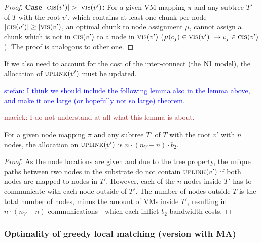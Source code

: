 \documentclass[9pt,twocolumn]{scrartcl}
\newcommand{\maciek}[1]{\textcolor{brown}{maciek: #1}}
\newcommand{\stefan}[1]{\textcolor{blue}{stefan: #1}}
\newcommand{\VmChunkAssignment}{\mu}
\newcommand{\NodeMapping}{\pi}
\newcommand{\SubstrateNode}{\ensuremath{v}}
\newcommand{\Uplink}{\ensuremath{\textsc{uplink}}}
\newcommand{\ChunkCount}{\ensuremath{\textsc{cis}}}
\newcommand{\VmCount}{\ensuremath{\textsc{vis}}}
\newcommand{\achunk}{\ensuremath{c}}
\newcommand{\CC}{\textsc{NI}}
\newcommand{\Tree}{\ensuremath{T}}
\newcommand{\CostCom}{\ensuremath{b_2}}
\newcommand{\Vms}{\ensuremath{n_V}}
\begin{document}
\begin{appendix}
\begin{proof}
\textbf{Case $|\ChunkCount(\SubstrateNode')| > |\VmCount(\SubstrateNode')$:}
For a given VM mapping $\NodeMapping$ and any subtree $\Tree'$ of $\Tree$
with the root $\SubstrateNode'$, which contains at least one chunk per
node $|\ChunkCount(\SubstrateNode')| \geq |\VmCount(\SubstrateNode')$, an
optimal chunk to node assignment $\VmChunkAssignment$, cannot assign a chunk
which is not in $\ChunkCount(\SubstrateNode')$ to a node in
$\VmCount(\SubstrateNode')$ ($\VmChunkAssignment(\achunk_j) \in
\VmCount(\SubstrateNode')~ \rightarrow \achunk_j \in
\ChunkCount(\SubstrateNode')$).
The proof is analogous to other one.
\end{proof}

If we also need to account for the cost of the inter-connect (the $\CC$ model),
the allocation of $\Uplink(\SubstrateNode')$ must be updated.

\stefan{I think we should include the following lemma also in the lemma above,
and make it one large (or hopefully not so large) theorem.}

\maciek{I do not understand at all what this lemma is about.}

\begin{lemma}
\label{lemma:comCost}
 For a given node mapping $\NodeMapping$ and any subtree $\Tree'$
 of $\Tree$ with the root $\SubstrateNode'$ with $n$ nodes,
 the allocation on
$\Uplink(\SubstrateNode')$ is $n \cdot (\Vms - n)
\cdot
\CostCom$.
\end{lemma}
\begin{proof}
As the node locations are given
and due to the tree property, the unique paths between
two nodes in the substrate do not contain
$\Uplink(\SubstrateNode')$ if both nodes are mapped to nodes in $\Tree'$.
However, each of the $n$ nodes inside $\Tree'$ has to communicate with each node
outside of $\Tree'$. The number of nodes outside $\Tree$ is the total number
of nodes, minus the amount of VMs inside $\Tree'$, resulting in $n \cdot (\Vms -
n)$ communications - which each inflict $\CostCom$ bandwidth costs.
\end{proof}

\subsubsection{Optimality of greedy local matching (version with MA)}

\end{appendix}
\end{document}
